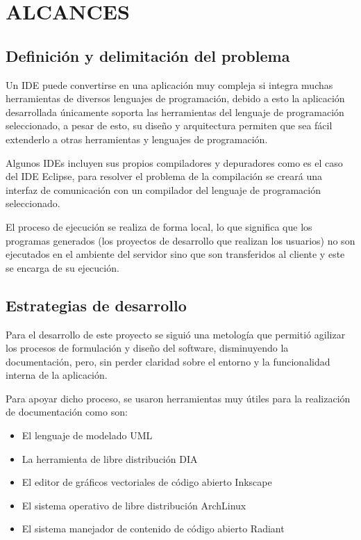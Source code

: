 \section{ALCANCES}

\subsection{Definición y delimitación del problema}

Un IDE puede convertirse en una aplicación muy compleja si integra muchas herramientas de diversos lenguajes de programación, debido a esto la aplicación desarrollada únicamente soporta las herramientas del lenguaje de programación seleccionado, a pesar de esto, su diseño y arquitectura permiten que sea fácil extenderlo a otras herramientas y lenguajes de programación.

Algunos IDEs incluyen sus propios compiladores y depuradores como es el caso del IDE Eclipse, para resolver el problema de la compilación se creará una interfaz de comunicación con un compilador del lenguaje de programación seleccionado.

El proceso de ejecución se realiza de forma local, lo que significa que los programas generados (los proyectos de desarrollo que realizan los usuarios) no son ejecutados en el ambiente del servidor sino que son transferidos al cliente y este se encarga de su ejecución.

\subsection{Estrategias de desarrollo}

Para el desarrollo de este proyecto se siguió una metología que permitió agilizar los procesos de formulación y diseño del software, disminuyendo la documentación, pero, sin perder claridad sobre el entorno y la funcionalidad interna de la aplicación.

Para apoyar dicho proceso, se usaron herramientas muy útiles para la realización de documentación como son:

\begin{itemize}
	\item El lenguaje de modelado UML \cite{uml}
	\item La herramienta de libre distribución DIA \cite{dia}
	\item El editor de gráficos vectoriales de código abierto Inkscape \cite{inkscape}
	\item El sistema operativo de libre distribución ArchLinux \cite{archlinux}
	\item El sistema manejador de contenido de código abierto Radiant \cite{radiant}
\end{itemize}

